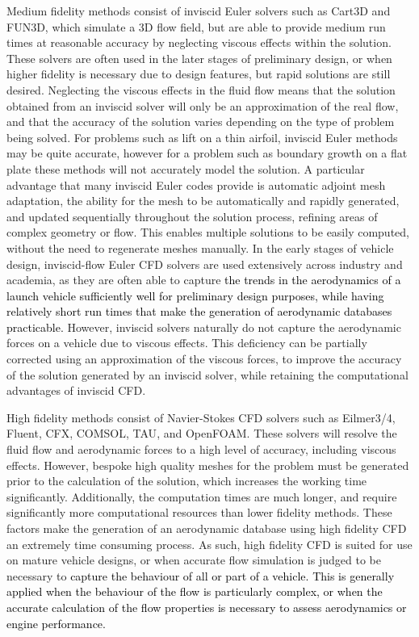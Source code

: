 Medium fidelity methods consist of inviscid Euler solvers such as Cart3D\cite{CART3D} and FUN3D\cite{fun3d}, which simulate a 3D flow field, but are able to provide medium run times at reasonable accuracy by neglecting viscous effects within the solution. These solvers are often used in the later stages of preliminary design, or when higher fidelity is necessary due to design features, but rapid solutions are still desired.  Neglecting the viscous effects in the fluid flow means that the solution obtained from an inviscid solver will only be an approximation of the real flow, and that the accuracy of the solution varies depending on the type of problem being solved. For problems such as lift on a thin airfoil, inviscid Euler methods may be quite accurate, however for a problem such as boundary growth on a flat plate these methods will not accurately model the solution\cite{NASAEuler}. A particular advantage that many inviscid Euler codes provide is automatic adjoint mesh adaptation, the ability for the mesh to be automatically and rapidly generated, and updated sequentially throughout the solution process, refining areas of complex geometry or flow. This enables multiple solutions to be easily computed, without the need to regenerate meshes manually. In the early stages of vehicle design, inviscid-flow Euler CFD solvers are used extensively across industry and academia\cite{Almosnino2016}, as they are often able to capture \textcolor{black}{the trends in the aerodynamics of a launch vehicle sufficiently well for preliminary design purposes, while having relatively short run times that make the generation of aerodynamic databases practicable.}
 However, inviscid solvers naturally do not capture the aerodynamic forces on a vehicle due to viscous effects. This deficiency can be partially corrected using an approximation of the viscous forces, to improve the accuracy of the solution generated by an inviscid solver, while retaining the computational advantages of inviscid CFD\cite{Ward2018}. 

High fidelity methods consist of Navier-Stokes CFD solvers such as Eilmer3/4\cite{Gollan2013b}, Fluent\cite{Ansys2014}, CFX\cite{CFX}, COMSOL\cite{comsol}, TAU\cite{Schwamborn2006}, and OpenFOAM\cite{openfoam}. These solvers will resolve the fluid flow and aerodynamic forces to a high level of accuracy, including viscous effects. However, bespoke high quality meshes for the problem must be generated prior to the calculation of the solution, which increases the working time significantly. Additionally, the computation times are much longer, and require significantly more computational resources than lower fidelity methods. These factors make the generation of an aerodynamic database using high fidelity CFD an extremely time consuming process. As such, high fidelity CFD is suited for use on mature vehicle designs, or when accurate flow simulation is judged to be necessary to \textcolor{black}{capture the behaviour of all or part of a vehicle. This is generally applied when the behaviour of the flow is particularly complex, or when the accurate calculation of the flow properties is necessary to assess aerodynamics or engine performance.}

